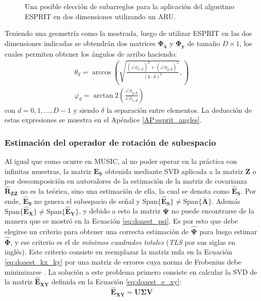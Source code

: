 \begin{figure}[ht!]
\begin{subfigure}[b]{0.49\textwidth}
    \end{subfigure}
    \caption{Una posible elección de subarreglos para la aplicación del algoritmo ESPRIT en dos dimensiones utilizando un ARU.}
    \label{fig:doaest_esprit2d}
\end{figure}

Teniendo una geometría como la mostrada, luego de utilizar ESPRIT en las dos dimensiones indicadas se obtendrán dos matrices $\mathbf{\Phi_x}$ y $\mathbf{\Phi_y}$ de tamaño $D\times 1$, los cuales permiten obtener los ángulos de arribo haciendo:
\begin{gather}
    \theta_d=\arccos\left( \sqrt{\frac{(\angle{\phi_{x,d}})^2+(\angle{\phi_{y,d}})^2 }{(k\cdot \delta)^2}},\label{eq:doaest_thetaesprit}\right)\\
    \varphi_d=\arctan2\left(\frac{\angle{\phi_{y,d}}}{\angle{\phi_{x,d}}} \right)\label{eq:doaest_phiesprit}
\end{gather}
con $d=0,1,...,D-1$ y siendo $\delta$ la separación entre elementos. La deducción de estas expresiones se muestra en el Apéndice \ref{AP:esprit_angles}.

\subsubsection{Estimación del operador de rotación de subespacio}
Al igual que como ocurre en MUSIC, al no poder operar en la práctica con infinitas muestras, la matriz $\mathbf{E_S}$ obtenida mediante SVD aplicada a la matriz $\mathbf{Z}$ o por descomposición en autovalores de la estimación de la matriz de covarianza $\mathbf{\hat{R}_{ZZ}}$ no es la teórica, sino una estimación de ella, la cual se denota como $\mathbf{\hat{E}_S}$. Por ende, $\mathbf{\hat{E}_S}$ no genera el subespacio de señal y $\textrm{Span}\{ \mathbf{\hat{E}_S} \}\neq \textrm{Span}\{ \mathbf{\bar{A}} \}$. Además $\textrm{Span}\{ \mathbf{\hat{E}_X} \}\neq \textrm{Span}\{ \mathbf{\hat{E}_Y} \}$, y debido a esto la matriz $\mathbf{\Psi}$ no puede encontrarse de la manera que se mostró en la Ecuación \ref{eq:doaest_psi}. Es por esto que debe elegirse un criterio para obtener una correcta estimación de $\mathbf{\hat{\Psi}}$ para luego estimar $\mathbf{\hat{\Phi}}$, y ese criterio es el de \emph{mínimos cuadrados totales} (\emph{TLS} por sus siglas en inglés). Este criterio consiste en reemplazar la matriz nula en la Ecuación \ref{eq:doaest_kx_ky} por una matriz de errores cuya norma de Frobenius debe minimizarse \cite{bib:esprit_roy}. La solución a este problema primero consiste en calcular la SVD de la matriz $\mathbf{\hat{E}_{XY}}$ definida en la Ecuación \ref{eq:doaest_e_xy}:
\begin{equation}
    \mathbf{\hat{E}_{XY}} = \mathbf{U\Sigma V}
\end{equation}

